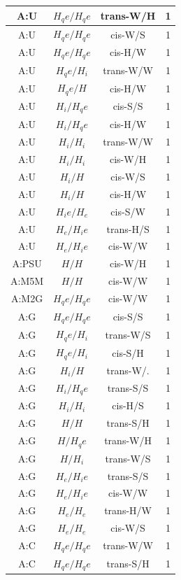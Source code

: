 \begin{center}
\begin{longtable}{c|c|c|c}
A:U & $H_qe/H_qe$ & trans-W/H & 1 \\  \hline
A:U & $H_qe/H_qe$ & cis-W/S & 1 \\  \hline
A:U & $H_qe/H_qe$ & cis-H/W & 1 \\  \hline
A:U & $H_qe/H_i$ & trans-W/W & 1 \\  \hline
A:U & $H_qe/H$ & cis-H/W & 1 \\  \hline
A:U & $H_i/H_qe$ & cis-S/S & 1 \\  \hline
A:U & $H_i/H_qe$ & cis-H/W & 1 \\  \hline
A:U & $H_i/H_i$ & trans-W/W & 1 \\  \hline
A:U & $H_i/H_i$ & cis-W/H & 1 \\  \hline
A:U & $H_i/H$ & cis-W/S & 1 \\  \hline
A:U & $H_i/H$ & cis-H/W & 1 \\  \hline
A:U & $H_ie/H_e$ & cis-S/W & 1 \\  \hline
A:U & $H_e/H_ie$ & trans-H/S & 1 \\  \hline
A:U & $H_e/H_ie$ & cis-W/W & 1 \\  \hline
A:PSU & $H/H$ & cis-W/H & 1 \\  \hline
A:M5M & $H/H$ & cis-W/W & 1 \\  \hline
A:M2G & $H_qe/H_qe$ & cis-W/W & 1 \\  \hline
A:G & $H_qe/H_qe$ & cis-S/S & 1 \\  \hline
A:G & $H_qe/H_i$ & trans-W/S & 1 \\  \hline
A:G & $H_qe/H_i$ & cis-S/H & 1 \\  \hline
A:G & $H_i/H$ & trans-W/. & 1 \\  \hline
A:G & $H_i/H_qe$ & trans-S/S & 1 \\  \hline
A:G & $H_i/H_i$ & cis-H/S & 1 \\  \hline
A:G & $H/H$ & trans-S/H & 1 \\  \hline
A:G & $H/H_qe$ & trans-W/H & 1 \\  \hline
A:G & $H/H_i$ & trans-W/S & 1 \\  \hline
A:G & $H_e/H_ie$ & trans-S/S & 1 \\  \hline
A:G & $H_e/H_ie$ & cis-W/W & 1 \\  \hline
A:G & $H_e/H_e$ & trans-H/W & 1 \\  \hline
A:G & $H_e/H_e$ & cis-W/S & 1 \\  \hline
A:C & $H_qe/H_qe$ & trans-W/W & 1 \\  \hline
A:C & $H_qe/H_qe$ & trans-S/H & 1 \\  \hline

\end{longtable}
\end{center}

